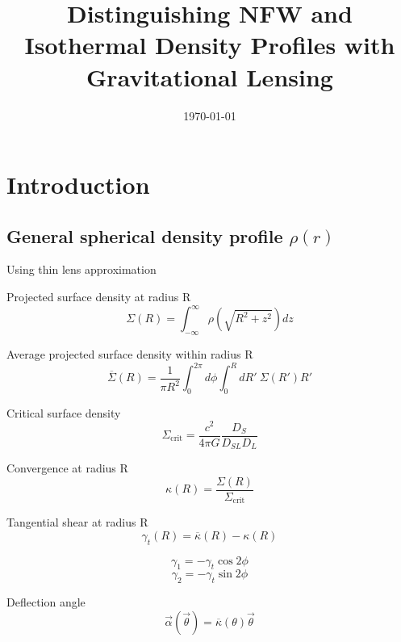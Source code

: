 \documentclass[]{article}
\begin{document}
\title{Distinguishing NFW and Isothermal Density Profiles with Gravitational Lensing}
\author{}
\date{\today}
\maketitle

\begin{abstract}

\end{abstract}

\section{Introduction}

\subsection{General spherical density profile $\rho(r)$}
Using thin lens approximation

Projected surface density at radius R
\begin{equation}
    \Sigma(R) = \int_{-\infty}^{\infty}{\rho(\sqrt{R^2 + z^2}) dz}
\end{equation}

Average projected surface density within radius R
\begin{equation}
    \overline{\Sigma}(R) = \frac{1}{\pi R^2} \int_0^{2\pi}{d\phi \int_0^{R}{dR'~\Sigma(R')R'}}
\end{equation}

Critical surface density
\begin{equation}
    \Sigma_\mathrm{crit} = \frac{c^2}{4\pi G} \frac{D_S}{D_{SL} D_L}
\end{equation}

Convergence at radius R
\begin{equation}
    \kappa(R) = \frac{\Sigma(R)}{\Sigma_\mathrm{crit}}
\end{equation}

Tangential shear at radius R
\begin{equation}
    \gamma_t(R) = \overline{\kappa}(R) - \kappa(R)
\end{equation}

\[\gamma_1 = -\gamma_t \cos{2\phi}\]
\[\gamma_2 = -\gamma_t \sin{2\phi}\]

Deflection angle
\begin{equation}
    \vec{\alpha}(\vec{\theta}) = \overline{\kappa}(\theta)\vec{\theta}
\end{equation}
\end{document}
